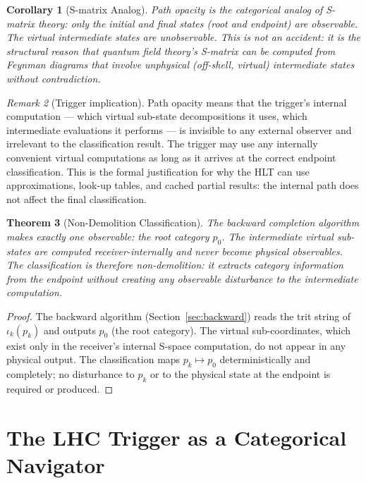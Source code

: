 \documentclass[twocolumn,10pt,a4paper]{article}
\theoremstyle{thmstyle}
\newtheorem{theorem}{Theorem}[section]
\newtheorem{corollary}[theorem]{Corollary}
\theoremstyle{definition}
\theoremstyle{remark}
\newtheorem{remark}[theorem]{Remark}
\begin{document}
\begin{corollary}[S-matrix Analog]
Path opacity is the categorical analog of S-matrix theory: only the initial
and final states (root and endpoint) are observable. The virtual
intermediate states are unobservable. This is not an accident: it is the
structural reason that quantum field theory's S-matrix can be computed from
Feynman diagrams that involve unphysical (off-shell, virtual) intermediate
states without contradiction.
\end{corollary}

\begin{remark}[Trigger implication]
Path opacity means that the trigger's internal computation — which virtual
sub-state decompositions it uses, which intermediate evaluations it performs —
is invisible to any external observer and irrelevant to the classification
result. The trigger may use any internally convenient virtual computations
as long as it arrives at the correct endpoint classification. This is the
formal justification for why the HLT can use approximations, look-up tables,
and cached partial results: the internal path does not affect the final
classification.
\end{remark}

\begin{theorem}[Non-Demolition Classification]
\label{thm:qnd_completion}
The backward completion algorithm makes exactly one observable: the root
category $p_0$. The intermediate virtual sub-states are computed
receiver-internally and never become physical observables.
The classification is therefore non-demolition: it extracts category
information from the endpoint without creating any observable disturbance
to the intermediate computation.
\end{theorem}

\begin{proof}
The backward algorithm (Section~\ref{sec:backward}) reads the trit string
of $\iota_k(p_k)$ and outputs $p_0$ (the root category). The virtual
sub-coordinates, which exist only in the receiver's internal S-space
computation, do not appear in any physical output. The classification
maps $p_k \mapsto p_0$ deterministically and completely; no disturbance
to $p_k$ or to the physical state at the endpoint is required or produced.
\end{proof}

\section{The LHC Trigger as a Categorical Navigator}
\label{sec:trigger}
\end{document}
